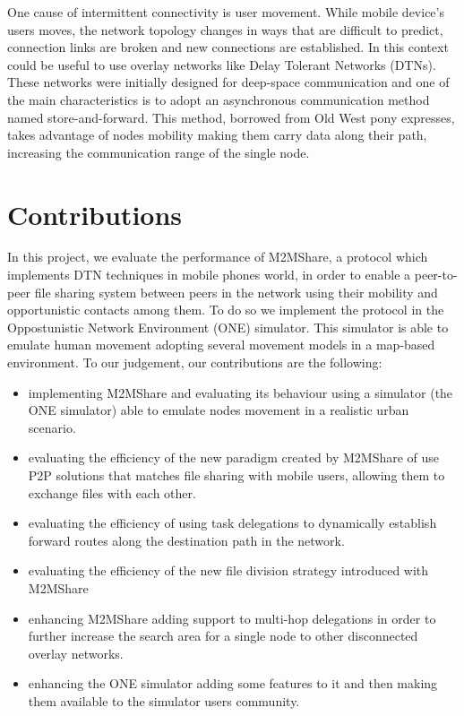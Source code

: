 One cause of intermittent connectivity is user movement. While mobile device's users moves, the network topology changes in ways that are difficult to predict, connection links are broken and new connections are established. In this context could be useful to use overlay networks like Delay Tolerant Networks (DTNs). These networks were initially designed for deep-space communication and one of the main characteristics is to adopt an asynchronous communication method named store-and-forward. This method, borrowed from Old West pony expresses, takes advantage of nodes mobility making them carry data along their path, increasing the communication range of the single node.



\section{Contributions}
In this project, we evaluate the performance of M2MShare, a protocol which implements DTN techniques in mobile phones world, in order to enable a peer-to-peer file sharing system between peers in the network using their mobility and opportunistic contacts among them. To do so we implement the protocol in the Oppostunistic Network Environment (ONE) simulator. This simulator is able to emulate human movement adopting several movement models in a map-based environment. To our judgement, our contributions are the following:
\begin{itemize}
\item implementing M2MShare and evaluating its behaviour using a simulator (the ONE simulator) able to emulate nodes movement in a realistic urban scenario.
\item evaluating the efficiency of the new paradigm created by M2MShare of use P2P solutions that matches file sharing with mobile users, allowing them to exchange files with each other.
\item evaluating the efficiency of using task delegations to dynamically establish forward routes along the destination path in the network.
\item evaluating the efficiency of the new file division strategy introduced with M2MShare 
\item enhancing M2MShare adding support to multi-hop delegations in order to further increase the search area for a single node to other disconnected overlay networks.
\item enhancing the ONE simulator adding some features to it and then making them available to the simulator users community.
\end{itemize}

